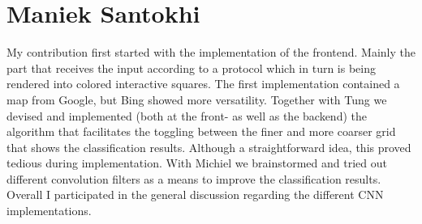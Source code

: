 \documentclass[a4paper,onecolumn]{report}
\begin{document}
\section{Maniek Santokhi}
My contribution first started with the implementation of the frontend. Mainly the part that receives the input according to a protocol which in turn is being rendered into colored interactive squares. The first implementation contained a map from Google, but Bing showed more versatility. Together with Tung we devised and implemented (both at the front- as well as the backend) the algorithm that facilitates the toggling between the finer and more coarser grid that shows the classification results. Although a straightforward idea, this proved tedious during implementation. With Michiel we brainstormed and tried out different convolution filters as a means to improve the classification results. Overall I participated in the general discussion regarding the different CNN implementations.



\end{document}
